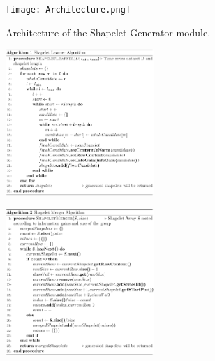 \documentclass[conference]{IEEEtran}  %
\begin{document}
\begin{figure}
\texttt{[image: Architecture.png]}
\caption{Architecture of the Shapelet Generator module.}
\label{fig:hintgen}
\end{figure}

\begin{figure}
\includegraphics[width=0.5\textwidth]{algo1.png}\squeezeup\squeezeup\squeezeup
\end{figure}
\begin{figure}
\includegraphics[width=0.5\textwidth]{algo2.png}\squeezeup\squeezeup\squeezeup
\end{figure}

\end{document}
